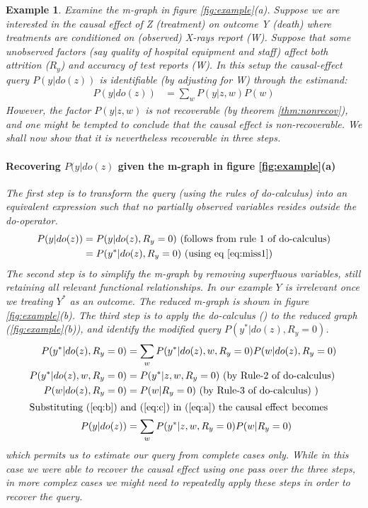 \documentclass[12pt]{article}
\newtheorem{example}{Example}
\begin{document}
\begin{example}
Examine the m-graph in figure \ref{fig:example}(a). Suppose we are interested in the causal effect of
Z (treatment) on outcome Y (death) where
treatments are conditioned on (observed) X-rays report
(W). Suppose that some unobserved factors
(say quality of hospital equipment and staff) affect both
attrition ($R_y$) and accuracy of test reports (W).
In this setup the causal-effect query $P(y|do(z))$ is
identifiable (by adjusting for W) through the estimand:
\begin{align}P(y|do(z))&= \sum_w P(y|z,w)P(w) \label{eq:v} \end{align}
However, the factor $P(y|z,w)$ is not recoverable (by theorem
\ref{thm:nonrecov}), and one might be tempted to conclude that
the causal effect is non-recoverable. We shall now
show that it is nevertheless recoverable in three steps.

\paragraph{Recovering $P(y|do(z)$ given the m-graph in figure
	\ref{fig:example}(a) }
The first step is to transform the query (using the rules of
do-calculus) into an equivalent expression such that no partially
observed variables resides outside the do-operator.
\begin{align}
P(y|do(z)) & =  P(y|do(z),R_y=0) \mbox{ (follows from rule 1 of
	do-calculus)} \nonumber \\
&=P(y^*|do(z),R_y=0) \mbox{ (using eq \ref{eq:miss1})}\label{eq:verma1}
\end{align}
The second step is to simplify the m-graph by removing
superfluous variables, still retaining all relevant functional
relationships. In our example $Y$ is irrelevant once we treating
$Y^*$ as an outcome. The reduced m-graph is shown in
figure \ref{fig:example}(b). The third step is
to apply the do-calculus (\cite{pearl})
	to the reduced graph (\ref{fig:example}(b)), and identify the modified query $P(y^*|do(z),R_y=0)$.
 \begin{align}
	P(y^*|do(z),R_y=0) &=  \sum_w P(y^*|do(z),w, R_y=0) P(w|do(z),R_y=0) \label{eq:a}  \\
	P(y^*|do(z),w, R_y=0) & = P(y^*|z,w,R_y=0)\label{eq:b}  \mbox{ (by Rule-2 of do-calculus) } \\
	P(w|do(z),R_y=0) & = P(w|R_y=0)\label{eq:c} \mbox{ (by Rule-3 of do-calculus) } ) \\	
	\intertext{Substituting (\ref{eq:b}) and (\ref{eq:c}) in (\ref{eq:a}) the causal effect becomes}
		P(y|do(z)) &= \sum_w P(y^*|z,w,R_y=0)P(w|R_y=0)\label{eq:v2}
\end{align}		
		which permits us to estimate our query from complete cases
		only. While in this case we were able to recover the causal effect using
		one pass over the three steps, in more complex cases we might need
		to repeatedly apply these steps in order to recover the query.
\end{example}		
\end{document}
